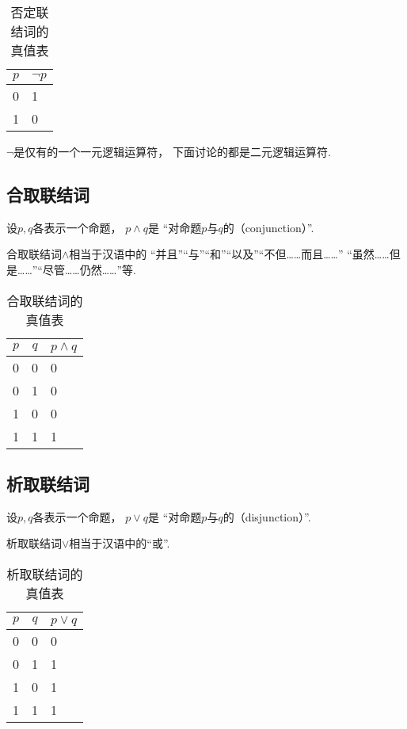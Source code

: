 \begin{table}[ht]
	\centering
	\begin{tabular}{|c|p{1.5cm}|}
		\hline
		\(p\) & \(\neg p\) \\
		\hline
		0 & 1 \\
		1 & 0 \\
		\hline
	\end{tabular}
	\caption{否定联结词的真值表}
\end{table}

\(\neg\)是仅有的一个一元逻辑运算符，
下面讨论的都是二元逻辑运算符.

\subsection{合取联结词}
设\(p,q\)各表示一个命题，
\(p \land q\)是
“对命题\(p\)与\(q\)的（conjunction）”.

合取联结词\(\land\)相当于汉语中的
“并且”“与”“和”“以及”“不但……而且……”
“虽然……但是……”“尽管……仍然……”等.

\begin{table}[ht]
	\centering
	\begin{tabular}{|*{2}{c|}p{2cm}|}
		\hline
		\(p\) & \(q\) & \(p \land q\) \\
		\hline
		0 & 0 & 0 \\
		0 & 1 & 0 \\
		1 & 0 & 0 \\
		1 & 1 & 1 \\
		\hline
	\end{tabular}
	\caption{合取联结词的真值表}
\end{table}

\subsection{析取联结词}
设\(p,q\)各表示一个命题，
\(p \lor q\)是
“对命题\(p\)与\(q\)的（disjunction）”.

析取联结词\(\lor\)相当于汉语中的“或”.

\begin{table}[ht]
	\centering
	\begin{tabular}{|*{2}{c|}p{2cm}|}
		\hline
		\(p\) & \(q\) & \(p \lor q\) \\
		\hline
		0 & 0 & 0 \\
		0 & 1 & 1 \\
		1 & 0 & 1 \\
		1 & 1 & 1 \\
		\hline
	\end{tabular}
	\caption{析取联结词的真值表}
\end{table}

